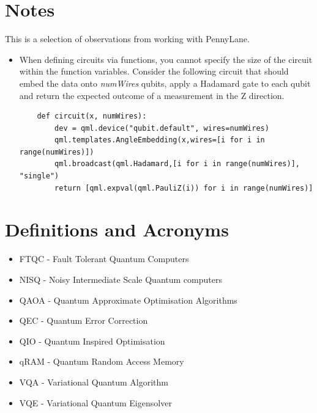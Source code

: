 \documentclass{article}
\theoremstyle{definition}
\begin{document}
\section{Notes}
This is a selection of observations from working with PennyLane.
\begin{itemize}
    \item When defining circuits via functions, you cannot specify the size of the circuit within the function variables. Consider the following circuit that should embed the data onto \textit{numWires} qubits, apply a Hadamard gate to each qubit and return the expected outcome of a measurement in the Z direction. 
    \begin{verbatim}
    def circuit(x, numWires):
        dev = qml.device("qubit.default", wires=numWires)
        qml.templates.AngleEmbedding(x,wires=[i for i in range(numWires)])
        qml.broadcast(qml.Hadamard,[i for i in range(numWires)], "single")
        return [qml.expval(qml.PauliZ(i)) for i in range(numWires)]
    \end{verbatim}
    
\end{itemize}

\clearpage
\printbibliography
\clearpage

\appendix 
\section{Definitions and Acronyms}
\begin{itemize}
    \item FTQC - Fault Tolerant Quantum Computers
    \item NISQ - Noisy Intermediate Scale Quantum computers
    \item QAOA - Quantum Approximate Optimisation Algorithms
    \item QEC - Quantum Error Correction
    \item QIO - Quantum Inspired Optimisation
    \item qRAM - Quantum Random Access Memory
    \item VQA - Variational Quantum Algorithm
    \item VQE - Variational Quantum Eigensolver

\end{itemize}
\end{document}

